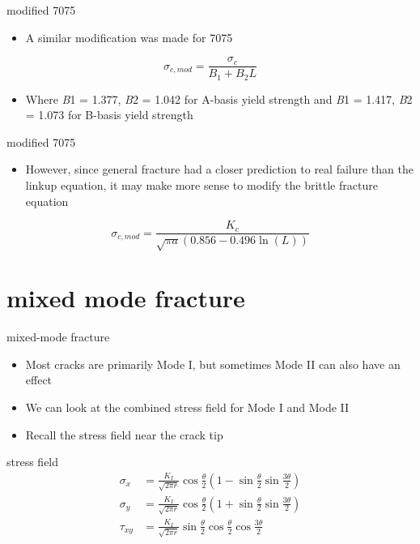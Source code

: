 \documentclass[
  letterpaper,
  ignorenonframetext,
  aspectratio=43,
  handout,
  12pt]{beamer}
\providecommand{\tightlist}{%
  \setlength{\itemsep}{0pt}\setlength{\parskip}{0pt}}
\providecommand{\tightlist}{%
\setlength{\itemsep}{0pt}\setlength{\parskip}{0pt}}
\begin{document}
\begin{frame}{modified 7075}
\protect\hypertarget{modified-7075}{}
\begin{itemize}
\tightlist
\item
  A similar modification was made for 7075
\end{itemize}

\[\sigma_{c,mod} = \frac{\sigma_c}{B_1 + B_2 L}\]

\begin{itemize}
\tightlist
\item
  Where \emph{B}1 = 1.377, \emph{B}2 = 1.042 for A-basis yield strength
  and \emph{B}1 = 1.417, \emph{B}2 = 1.073 for B-basis yield strength
\end{itemize}
\end{frame}

\begin{frame}{modified 7075}
\protect\hypertarget{modified-7075-1}{}
\begin{itemize}
\tightlist
\item
  However, since general fracture had a closer prediction to real
  failure than the linkup equation, it may make more sense to modify the
  brittle fracture equation
\end{itemize}

\[\sigma_{c,mod} = \frac{K_c}{\sqrt{\pi a} (0.856 - 0.496 \ln(L))}\]
\end{frame}

\hypertarget{mixed-mode-fracture}{%
\section{mixed mode fracture}\label{mixed-mode-fracture}}

\begin{frame}{mixed-mode fracture}
\protect\hypertarget{mixed-mode-fracture-1}{}
\begin{itemize}
\tightlist
\item
  Most cracks are primarily Mode I, but sometimes Mode II can also have
  an effect
\item
  We can look at the combined stress field for Mode I and Mode II
\item
  Recall the stress field near the crack tip
\end{itemize}
\end{frame}

\begin{frame}{stress field}
\protect\hypertarget{stress-field}{}
\[\begin{aligned}
  \sigma_x &= \frac{K_I}{\sqrt{2\pi r}} \cos \frac{\theta}{2} \left(1-\sin \frac{\theta}{2}\sin \frac{3\theta}{2}\right)\\
  \sigma_y &= \frac{K_I}{\sqrt{2\pi r}} \cos \frac{\theta}{2} \left(1+\sin \frac{\theta}{2}\sin \frac{3\theta}{2}\right)\\
  \tau_{xy} &= \frac{K_I}{\sqrt{2\pi r}} \sin \frac{\theta}{2} \cos \frac{\theta}{2}\cos \frac{3\theta}{2}
\end{aligned}\]
\end{frame}
\end{document}
